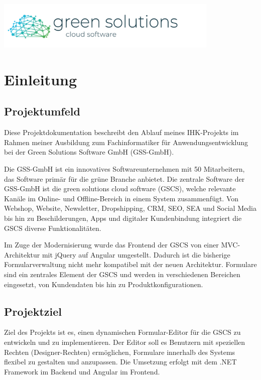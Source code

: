 \documentclass[a4paper,11pt]{article}
\begin{document}
\begin{titlepage}
\begin{center}
\includegraphics[width=0.8\textwidth]{green_solutions_logo}
\end{center}
\end{titlepage}


\section{Einleitung}

\subsection{Projektumfeld}

Diese Projektdokumentation beschreibt den Ablauf meines IHK-Projekts im Rahmen meiner Ausbildung zum Fachinformatiker für Anwendungsentwicklung bei der Green Solutions Software GmbH (GSS-GmbH).

Die GSS-GmbH ist ein innovatives Softwareunternehmen mit 50 Mitarbeitern, das Software primär für die grüne Branche anbietet. Die zentrale Software der GSS-GmbH ist die green solutions cloud software (GSCS), welche relevante Kanäle im Online- und Offline-Bereich in einem System zusammenfügt. Von Webshop, Website, Newsletter, Dropshipping, CRM, SEO, SEA und Social Media bis hin zu Beschilderungen, Apps und digitaler Kundenbindung integriert die GSCS diverse Funktionalitäten.

Im Zuge der Modernisierung wurde das Frontend der GSCS von einer MVC-Architektur mit jQuery auf Angular umgestellt. Dadurch ist die bisherige Formularverwaltung nicht mehr kompatibel mit der neuen Architektur. Formulare sind ein zentrales Element der GSCS und werden in verschiedenen Bereichen eingesetzt, von Kundendaten bis hin zu Produktkonfigurationen.

\subsection{Projektziel}

Ziel des Projekts ist es, einen dynamischen Formular-Editor für die GSCS zu entwickeln und zu implementieren. Der Editor soll es Benutzern mit speziellen Rechten (Designer-Rechten) ermöglichen, Formulare innerhalb des Systems flexibel zu gestalten und anzupassen. Die Umsetzung erfolgt mit dem .NET Framework im Backend und Angular im Frontend.
\end{document}
